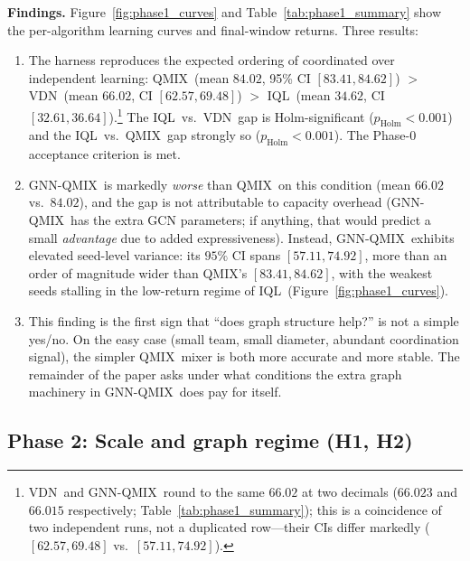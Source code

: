 \documentclass[manuscript, screen, review]{jair}
\newcommand{\algoname}[1]{\textsc{#1}}
\newcommand{\iql}{\algoname{IQL}}
\newcommand{\vdn}{\algoname{VDN}}
\newcommand{\qmix}{\algoname{QMIX}}
\newcommand{\gnnqmix}{\algoname{GNN-QMIX}}
\begin{document}
\textbf{Findings.} Figure~\ref{fig:phase1_curves} and
Table~\ref{tab:phase1_summary} show the per-algorithm learning curves and
final-window returns. Three results:
\begin{enumerate}[leftmargin=*,itemsep=0pt,topsep=2pt]
  \item The harness reproduces the expected ordering of coordinated over
        independent learning: \qmix\ (mean $84.02$, 95\% CI
        $[83.41, 84.62]$) $>$ \vdn\ (mean $66.02$, CI $[62.57, 69.48]$) $>$
        \iql\ (mean $34.62$, CI $[32.61, 36.64]$).\footnote{\vdn\ and \gnnqmix\
        round to the same $66.02$ at two decimals ($66.023$ and $66.015$
        respectively; Table~\ref{tab:phase1_summary}); this is a coincidence of
        two independent runs, not a duplicated row---their CIs differ markedly
        ($[62.57, 69.48]$ vs.\ $[57.11, 74.92]$).} The \iql\ vs.\ \vdn\ gap
        is Holm-significant ($p_{\text{Holm}} < 0.001$) and the \iql\
        vs.\ \qmix\ gap strongly so ($p_{\text{Holm}} < 0.001$). The
        Phase-0 acceptance criterion is met.
  \item \gnnqmix\ is markedly \emph{worse} than \qmix\ on this condition
        (mean $66.02$ vs.\ $84.02$), and the gap is not attributable to
        capacity overhead (\gnnqmix\ has the extra GCN parameters; if
        anything, that would predict a small \emph{advantage} due to
        added expressiveness). Instead, \gnnqmix\ exhibits elevated
        seed-level variance: its $95\%$ CI spans $[57.11, 74.92]$, more than
        an order of magnitude wider than \qmix's $[83.41, 84.62]$, with the
        weakest seeds stalling in the low-return regime of \iql\
        (Figure~\ref{fig:phase1_curves}).
  \item This finding is the first sign that ``does graph structure
        help?'' is not a simple yes/no. On the easy case (small team,
        small diameter, abundant coordination signal), the simpler
        \qmix\ mixer is both more accurate and more stable. The
        remainder of the paper asks under what conditions the extra
        graph machinery in \gnnqmix\ does pay for itself.
\end{enumerate}



\subsection{Phase 2: Scale and graph regime (H1, H2)}
\label{sec:results:scale}
\end{document}
